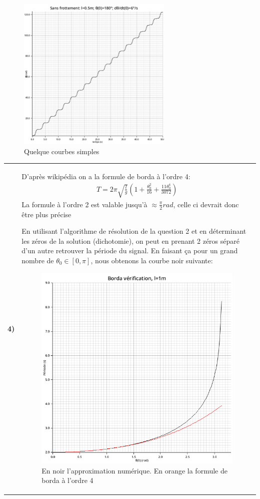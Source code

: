 \documentclass{article}
\newcommand{\question}[2]
{
    \begin{tabularx}{\linewidth}{lX}
        \textbf{#1)} & {#2}
    \end{tabularx} 
}
\begin{document}
{{\begin{figure}[H]
        \includegraphics[width=20em]{images/pendule_180_vi.png}
        \caption{Quelque courbes simples}
    \end{figure}

    }

    \question{4}{
      D'après wikipédia on a la formule de borda à l'ordre 4:
      \begin{align*}
        \boxed{T=2\pi\sqrt{\frac{l}{g}}\left(1+\frac{\theta_0^2}{16}+\frac{11\theta_0^4}{3072}\right)}
      \end{align*}
      La formule à l'ordre 2 est valable jusqu'à $\approx\frac{\pi}{2}rad$, celle ci devrait donc être plus précise

      En utilisant l'algorithme de résolution de la question 2 et en déterminant les zéros de la solution (dichotomie), on peut en prenant 2 zéros séparé d'un autre retrouver la période du signal. En faisant ça pour un grand nombre de $\theta_0\in[0,\pi]$, nous obtenons la courbe noir suivante:
      \begin{figure}[H]
        \centering
        \includegraphics[width=35em]{images/borda.png}
        \caption{En noir l'approximation numérique. En orange la formule de borda à l'ordre 4}
      \end{figure}

}}
\end{document}
